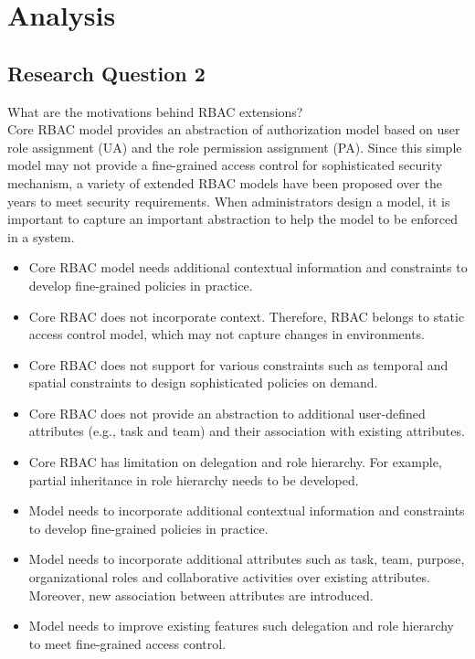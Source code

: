 \section{Analysis} \label{sec:analysis}

\subsection{Research Question 2}

What are the motivations behind RBAC extensions? \\

Core RBAC model provides an abstraction of authorization model based on user role assignment (UA) and the role
permission assignment (PA). Since this simple model may not provide a fine-grained access control for sophisticated
security mechanism, a variety of extended RBAC models have been proposed over the years to meet
security requirements. When administrators design a model, it is important to capture an important abstraction to help the model to be enforced in a system.

\begin{itemize}
\item Core RBAC model needs additional contextual information and constraints to develop fine-grained policies in practice.
\item Core RBAC does not incorporate context. Therefore, RBAC belongs to static access control model, which may not capture changes in environments.
\item Core RBAC does not support for various constraints such as temporal and spatial constraints to design sophisticated policies on demand.
\item Core RBAC does not provide an abstraction to additional user-defined attributes	(e.g., task and team) and their association with existing attributes.
\item Core RBAC has limitation on delegation and role hierarchy. For example, partial inheritance in role hierarchy needs to be developed.  
\item Model needs to incorporate additional contextual information and constraints to develop fine-grained policies in practice.
\item Model needs to incorporate additional attributes such as
task, team, purpose, organizational roles and collaborative activities over existing attributes. Moreover, new association between attributes
are introduced. 
\item Model needs to improve existing features such delegation and role hierarchy to meet fine-grained access control. 
\end{itemize}


